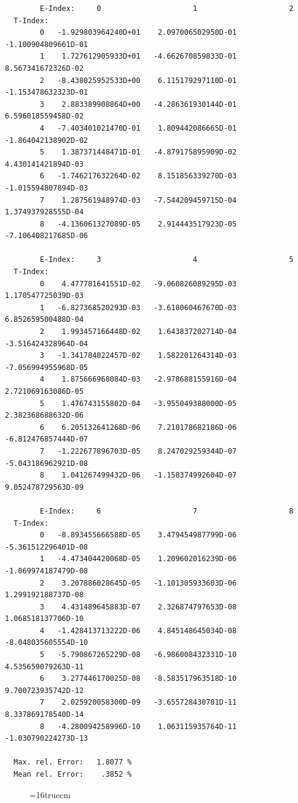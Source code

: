\documentclass[12pt,dvips]{article}
\begin{document}
\begin{small}\begin{verbatim}
        E-Index:     0                     1                     2
  T-Index:
        0   -1.929803964240D+01    2.097006502950D-01   -1.100904809661D-01
        1    1.727612905933D+01   -4.662670859833D-01    8.567341672326D-02
        2   -8.438025952533D+00    6.115179297110D-01   -1.153478632323D-01
        3    2.883389908864D+00   -4.286361930144D-01    6.596018559458D-02
        4   -7.403401021470D-01    1.809442086665D-01   -1.864042138902D-02
        5    1.387371448471D-01   -4.879175895909D-02    4.430141421894D-03
        6   -1.746217632264D-02    8.151856339270D-03   -1.015594807894D-03
        7    1.287561948974D-03   -7.544209459715D-04    1.374937928555D-04
        8   -4.136061327089D-05    2.914443517923D-05   -7.106408217685D-06

        E-Index:     3                     4                     5
  T-Index:
        0    4.477781641551D-02   -9.060826089295D-03    1.170547725039D-03
        1   -6.827368520293D-03   -3.618060467670D-03    6.852659500488D-04
        2    1.993457166448D-02    1.643837202714D-04   -3.516424328964D-04
        3   -1.341784022457D-02    1.582201264314D-03   -7.056994955968D-05
        4    1.875666968084D-03   -2.978688155916D-04    2.721069163086D-05
        5    1.476743155802D-04   -3.955049388000D-05    2.382368688632D-06
        6    6.205132641268D-06    7.210178682186D-06   -6.812476857444D-07
        7   -1.222677896703D-05    8.247029259344D-07   -5.043186962921D-08
        8    1.041267499432D-06   -1.158374992604D-07    9.052478729563D-09

        E-Index:     6                     7                     8
  T-Index:
        0   -8.893455666588D-05    3.479454987799D-06   -5.361512296401D-08
        1   -4.473404420068D-05    1.209602016239D-06   -1.069974187479D-08
        2    3.207886028645D-05   -1.101305933603D-06    1.299192188737D-08
        3    4.431489645883D-07    2.326874797653D-08    1.068518137706D-10
        4   -1.428413713222D-06    4.845148645034D-08   -8.048035605554D-10
        5   -5.790867265229D-08   -6.986008432331D-10    4.535659079263D-11
        6    3.277446170025D-08   -8.583517963518D-10    9.700723935742D-12
        7    2.025920058300D-09   -3.655728430701D-11    8.337869178540D-14
        8   -4.280094258996D-10    1.063115935764D-11   -1.030790224273D-13

  Max. rel. Error:   1.8077 %
  Mean rel. Error:    .3852 %

\end{verbatim}\end{small}
\begin{figure} \label{h12_2.0a}
\epsfxsize=16truecm
\end{figure}
\end{document}
